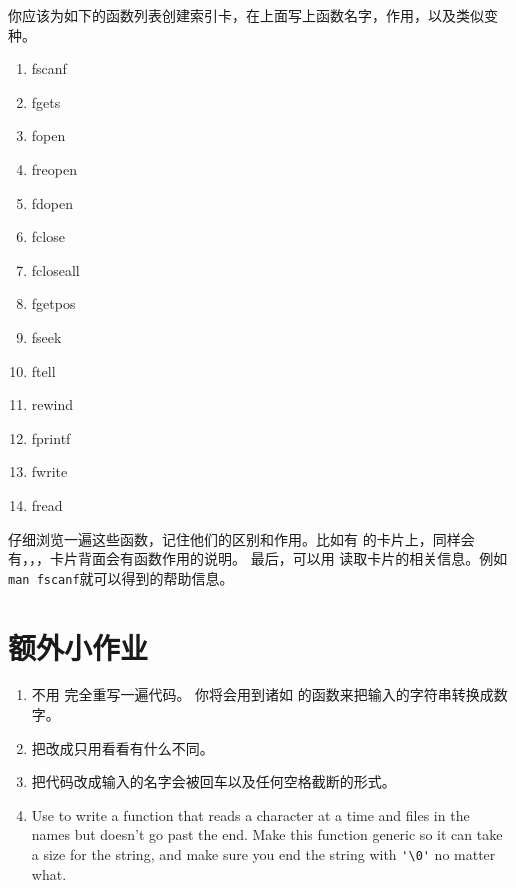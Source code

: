 你应该为如下的函数列表创建索引卡，在上面写上函数名字，作用，以及类似变种。

\begin{enumerate}
\item fscanf
\item fgets
\item fopen
\item freopen
\item fdopen
\item fclose
\item fcloseall
\item fgetpos
\item fseek
\item ftell
\item rewind
\item fprintf
\item fwrite
\item fread
\end{enumerate}

仔细浏览一遍这些函数，记住他们的区别和作用。比如有 的卡片上，同样会有，，，卡片背面会有函数作用的说明。
最后，可以用  读取卡片的相关信息。例如\verb|man fscanf|就可以得到的帮助信息。 

\section{额外小作业}

\begin{enumerate}
\item 不用  完全重写一遍代码。  你将会用到诸如 的函数来把输入的字符串转换成数字。
\item 把改成只用看看有什么不同。
\item 把代码改成输入的名字会被回车以及任何空格截断的形式。
\item Use  to write a function that reads a character at a time
    and files in the names but doesn't go past the end.  Make this function
    generic so it can take a size for the string, and make sure you end
    the string with \verb|'\0'| no matter what.
\end{enumerate}

